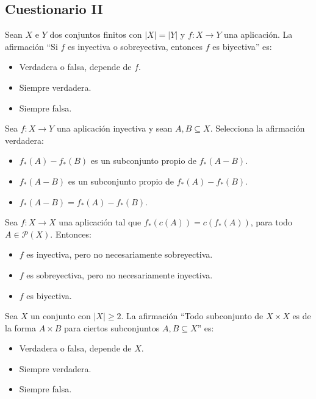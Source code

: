 \documentclass[12pt]{article}
\newcounter{ejercicio}[section] %
\newcounter{ejercicio}
\newcommand{\resetearcontador}{%
  \setcounter{ejercicio}{0} %
}
\begin{document}
    \newpage
    \resetearcontador
    \subsection{Cuestionario II}
    \begin{ejercicio}
        Sean $X$ e $Y$ dos conjuntos finitos con $|X| = |Y|$ y $f:X \rightarrow Y$ una aplicación. La afirmación ``Si $f$ es inyectiva o sobreyectiva, entonces $f$ es biyectiva'' es:
        \begin{itemize}
            \item Verdadera o falsa, depende de $f$.
            \item Siempre verdadera.
            \item Siempre falsa.
        \end{itemize}
    \end{ejercicio}

    \begin{ejercicio}
        Sea $f:X \rightarrow Y$ una aplicación inyectiva y sean $A, B \subseteq X$. Selecciona la afirmación verdadera:
        \begin{itemize}
            \item $f_{*}(A) - f_{*}(B)$ es un subconjunto propio de $f_{*}(A-B)$.
            \item $f_{*}(A-B)$ es un subconjunto propio de $f_{*}(A) - f_{*}(B)$.
            \item $f_{*}(A-B) = f_{*}(A) - f_{*}(B)$.
        \end{itemize}
    \end{ejercicio}

    \begin{ejercicio}
        Sea $f:X \rightarrow X$ una aplicación tal que $f_{*}(c(A)) = c(f_{*}(A))$, para todo $A \in \mathcal{P}(X)$. Entonces:
        \begin{itemize}
            \item $f$ es inyectiva, pero no necesariamente sobreyectiva.
            \item $f$ es sobreyectiva, pero no necesariamente inyectiva.
            \item $f$ es biyectiva.
        \end{itemize}
    \end{ejercicio}

    \begin{ejercicio}
    Sea $X$ un conjunto con $|X|\geq 2$. La afirmación ``Todo subconjunto de $X \times X$ es de la forma $A \times B$ para ciertos subconjuntos $A, B \subseteq X$'' es:
        \begin{itemize}
            \item Verdadera o falsa, depende de $X$.
            \item Siempre verdadera.
            \item Siempre falsa.
        \end{itemize}
    \end{ejercicio}
\end{document}
